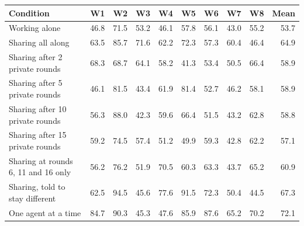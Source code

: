 \begin{tabular}{l rrrrrrrr r}
\toprule
Condition & W1 & W2 & W3 & W4 & W5 & W6 & W7 & W8 & Mean \\
\midrule
Working alone & 46.8 & 71.5 & 53.2 & 46.1 & 57.8 & 56.1 & 43.0 & 55.2 & 53.7 \\
Sharing all along & 63.5 & 85.7 & 71.6 & 62.2 & 72.3 & 57.3 & 60.4 & 46.4 & 64.9 \\
Sharing after 2 private rounds & 68.3 & 68.7 & 64.1 & 58.2 & 41.3 & 53.4 & 50.5 & 66.4 & 58.9 \\
Sharing after 5 private rounds & 46.1 & 81.5 & 43.4 & 61.9 & 81.4 & 52.7 & 46.2 & 58.1 & 58.9 \\
Sharing after 10 private rounds & 56.3 & 88.0 & 42.3 & 59.6 & 66.4 & 51.5 & 43.2 & 62.8 & 58.8 \\
Sharing after 15 private rounds & 59.2 & 74.5 & 57.4 & 51.2 & 49.9 & 59.3 & 42.8 & 62.2 & 57.1 \\
Sharing at rounds 6, 11 and 16 only & 56.2 & 76.2 & 51.9 & 70.5 & 60.3 & 63.3 & 43.7 & 65.2 & 60.9 \\
Sharing, told to stay different & 62.5 & 94.5 & 45.6 & 77.6 & 91.5 & 72.3 & 50.4 & 44.5 & 67.3 \\
One agent at a time & 84.7 & 90.3 & 45.3 & 47.6 & 85.9 & 87.6 & 65.2 & 70.2 & 72.1 \\
\bottomrule
\end{tabular}